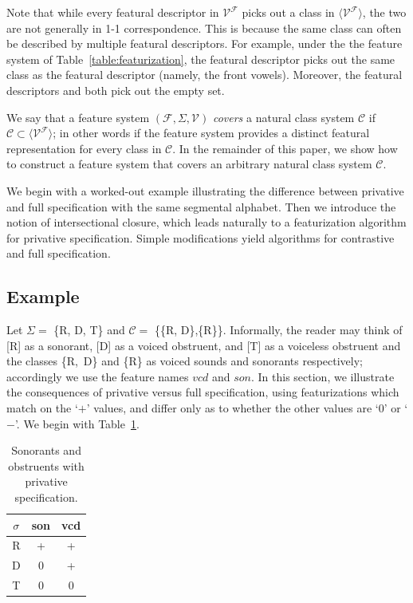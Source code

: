 \documentclass[11pt, oneside]{article}   	%
\begin{document}
Note that while every featural descriptor in $\mathcal V^\mathcal F$ picks out a class in $\langle \mathcal V^\mathcal F \rangle$, the two are not generally in 1-1 correspondence. This is because the same class can often be described by multiple featural descriptors. For example, under the the feature system of Table~\ref{table:featurization}, the featural descriptor  picks out the same class as the featural descriptor  (namely, the front vowels). Moreover, the featural descriptors  and  both pick out the empty set.

\vspace{\baselineskip} We say that a feature system $(\mathcal F, \Sigma, \mathcal V)$ \textit{covers} a natural class system $\mathcal C$ if $\mathcal C \subset \langle \mathcal V^\mathcal F \rangle$; in other words if the feature system provides a distinct featural representation for every class in $\mathcal C$. In the remainder of this paper, we show how to construct a feature system that covers an arbitrary natural class system $\mathcal C$.

We begin with a worked-out example illustrating the difference between privative and full specification with the same segmental alphabet. Then we introduce the notion of intersectional closure, which leads naturally to a featurization algorithm for privative specification. Simple modifications yield algorithms for contrastive and full specification.

\subsection{Example}

Let $\Sigma =$ \{R, D, T\} and $\mathcal{C} = $ \{\{R, D\},\{R\}\}. Informally, the reader may think of [R] as a sonorant, [D] as a voiced obstruent, and [T] as a voiceless obstruent and the classes \mbox{\{R, D\}} and \{R\} as voiced sounds and sonorants respectively; accordingly we use the feature names $vcd$ and $son$. In this section, we illustrate the consequences of privative versus full specification, using featurizations which match on the `$+$' values, and differ only as to whether the other values are `$0$' or `$-$'. We begin with Table~\ref{table:privative}.

\begin{table}[h]
    \centering
    \begin{tabular} {|c||c|c|}
    \hline
        $\sigma$ & son & vcd \\ \hline
        R & + & + \\
        D & 0 & + \\
        T & 0 & 0 \\
        \hline
    \end{tabular}
    \caption{Sonorants and obstruents with privative specification.}
    \label{table:privative}
\end{table}
\end{document}
